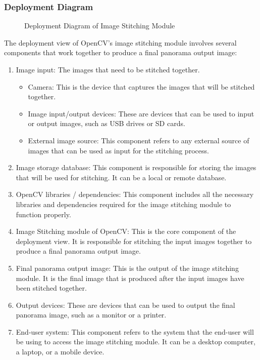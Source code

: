 \subsubsection{Deployment Diagram\label{subsubSection::DeploymentDiag}}
\begin{figure}[H]
     \centering
     \caption{\label{Figure::DeploymentDiagram} Deployment Diagram of Image Stitching Module}
\end{figure}
The deployment view of OpenCV's image stitching module involves several components that work together to produce a final panorama output image: 
\begin{enumerate}
    \item Image input: The images that need to be stitched together.
    \begin{itemize}
        \item Camera: This is the device that captures the images that will be stitched together. 
        \item Image input/output devices: These are devices that can be used to input or output images, such as USB drives or SD cards. 
        \item External image source: This component refers to any external source of images that can be used as input for the stitching process.
    \end{itemize}
    \item Image storage database: This component is responsible for storing the images that will be used for stitching. It can be a local or remote database.

    \item OpenCV libraries / dependencies: This component includes all the necessary libraries and dependencies required for the image stitching module to function properly.

    \item Image Stitching module of OpenCV: This is the core component of the deployment view. It is responsible for stitching the input images together to produce a final panorama output image.

    \item Final panorama output image: This is the output of the image stitching module. It is the final image that is produced after the input images have been stitched together.

    \item Output devices: These are devices that can be used to output the final panorama image, such as a monitor or a printer.

    \item End-user system: This component refers to the system that the end-user will be using to access the image stitching module. It can be a desktop computer, a laptop, or a mobile device.
\end{enumerate}
